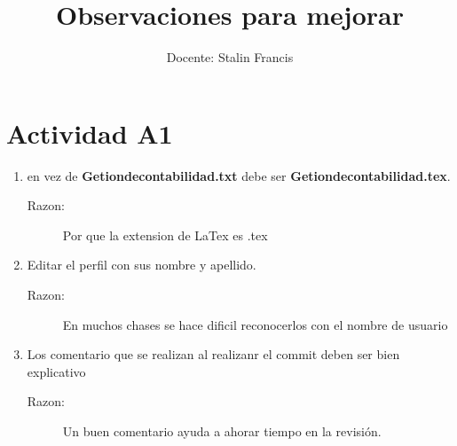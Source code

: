 \documentclass{article}
\title{Observaciones para mejorar}
\author{Docente: Stalin Francis}
\begin{document}
\maketitle
\section{Actividad A1}
\begin{enumerate}
\item en vez de \textbf{Getiondecontabilidad.txt}  debe ser \textbf{Getiondecontabilidad.tex}.
\begin{description}
\item[Razon:] Por que la extension de LaTex es .tex
\end{description}
\item Editar el perfil con sus nombre y apellido.
\begin{description}
\item[Razon:] En muchos chases se hace dificil reconocerlos con el nombre de usuario
\end{description}
\item Los comentario que se realizan al realizanr el commit deben ser bien explicativo
\begin{description}
\item[Razon:] Un buen comentario ayuda a ahorar tiempo en la revisión.
\end{description}
\end{enumerate}
\end{document}
